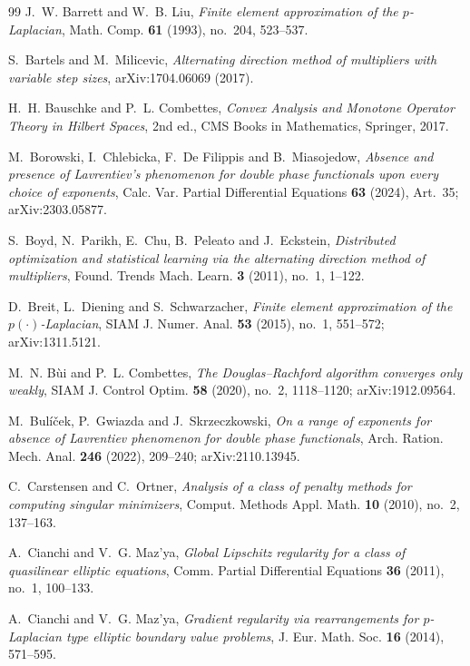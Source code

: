 \documentclass[11pt]{amsart}
\theoremstyle{definition}
\theoremstyle{remark}
\numberwithin{equation}{section}
\begin{document}
\begin{thebibliography}{99}
J.~W. Barrett and W.~B. Liu, \emph{Finite element approximation of the $p$-Laplacian}, Math. Comp. \textbf{61} (1993), no.~204, 523--537.

S.~Bartels and M.~Milicevic, \emph{Alternating direction method of multipliers with variable step sizes}, arXiv:1704.06069 (2017).

H.~H. Bauschke and P.~L. Combettes, \emph{Convex Analysis and Monotone Operator Theory in Hilbert Spaces}, 2nd ed., CMS Books in Mathematics, Springer, 2017.

M.~Borowski, I.~Chlebicka, F.~De Filippis and B.~Miasojedow, \emph{Absence and presence of Lavrentiev's phenomenon for double phase functionals upon every choice of exponents}, Calc. Var. Partial Differential Equations \textbf{63} (2024), Art.~35; arXiv:2303.05877.

S.~Boyd, N.~Parikh, E.~Chu, B.~Peleato and J.~Eckstein, \emph{Distributed optimization and statistical learning via the alternating direction method of multipliers}, Found. Trends Mach. Learn. \textbf{3} (2011), no.~1, 1--122.

D.~Breit, L.~Diening and S.~Schwarzacher, \emph{Finite element approximation of the $p(\cdot)$-Laplacian}, SIAM J. Numer. Anal. \textbf{53} (2015), no.~1, 551--572; arXiv:1311.5121.

M.~N. B\`ui and P.~L. Combettes, \emph{The Douglas--Rachford algorithm converges only weakly}, SIAM J. Control Optim. \textbf{58} (2020), no.~2, 1118--1120; arXiv:1912.09564.

M.~Bul\'i\v{c}ek, P.~Gwiazda and J.~Skrzeczkowski, \emph{On a range of exponents for absence of Lavrentiev phenomenon for double phase functionals}, Arch. Ration. Mech. Anal. \textbf{246} (2022), 209--240; arXiv:2110.13945.

C.~Carstensen and C.~Ortner, \emph{Analysis of a class of penalty methods for computing singular minimizers}, Comput. Methods Appl. Math. \textbf{10} (2010), no.~2, 137--163.

A.~Cianchi and V.~G. Maz'ya, \emph{Global Lipschitz regularity for a class of quasilinear elliptic equations}, Comm. Partial Differential Equations \textbf{36} (2011), no.~1, 100--133.

A.~Cianchi and V.~G. Maz'ya, \emph{Gradient regularity via rearrangements for $p$-Laplacian type elliptic boundary value problems}, J. Eur. Math. Soc. \textbf{16} (2014), 571--595.


\end{thebibliography}
\end{document}

